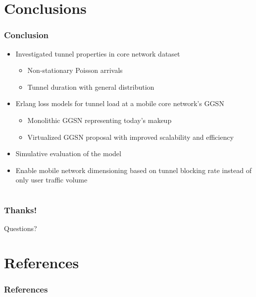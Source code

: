 \documentclass{beamer}
\begin{document}
\section{Conclusions}

\begin{frame}
	\frametitle{Conclusion}

	\begin{itemize}
		\item Investigated tunnel properties in core network dataset

		\begin{itemize}
			\item Non-stationary Poisson arrivals
			\item Tunnel duration with general distribution
		\end{itemize}

		\item Erlang loss models for tunnel load at a mobile core network's GGSN
		\begin{itemize}
			\item Monolithic GGSN representing today's makeup
			\item Virtualized GGSN proposal with improved scalability and efficiency
		\end{itemize}

		\item Simulative evaluation of the model

		\item Enable mobile network dimensioning based on tunnel blocking rate instead of only user traffic volume


	\end{itemize}

\end{frame}

\section*{}
\begin{frame}
	\frametitle{Thanks!}

	\centering
		\Large Questions?
\end{frame}




\section{References}
\begin{frame}[t,allowframebreaks]
	\frametitle{References}
	\printbibliography
\end{frame}
\end{document}
